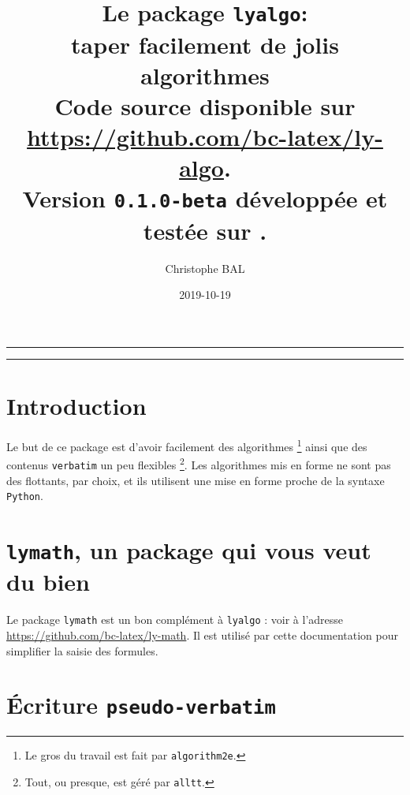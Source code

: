 \documentclass[12pt,a4paper]{article}
\theoremstyle{definition}
\begin{document}
\renewcommand\labelitemi{\raisebox{0.125em}{\tiny\textbullet}}
\renewcommand{\labelitemii}{---}

\title{%
	Le package \texttt{lyalgo}:
	\\
	taper facilement de jolis algorithmes
	\\
	{
		\footnotesize Code source disponible
		sur \url{https://github.com/bc-latex/ly-algo}.%
	}
	\\
	{
		\footnotesize Version \texttt{0.1.0-beta}
		développée et testée sur \macosxname{}.%
	}
}

\author{Christophe BAL}
\date{2019-10-19}

\maketitle


\vspace{2em}

\hrule

\tableofcontents

\vspace{1.5em}

\hrule

\newpage



\section{Introduction}

Le but de ce package est d'avoir facilement des algorithmes
\footnote{
	Le gros du travail est fait par \texttt{algorithm2e}.
}
ainsi que des contenus \verb+verbatim+ un peu flexibles
\footnote{
	Tout, ou presque, est géré par \texttt{alltt}.
}.
Les algorithmes mis en forme ne sont pas des flottants, par choix, et ils utilisent une mise en forme proche de la syntaxe \verb+Python+.




\section{\texttt{lymath}, un package qui vous veut du bien}

Le package \verb+lymath+ est un bon complément à \verb+lyalgo+ : voir à l'adresse \url{https://github.com/bc-latex/ly-math}. 
Il est utilisé par cette documentation pour simplifier la saisie des formules.




\section{Écriture \texttt{pseudo-verbatim}}
\end{document}
